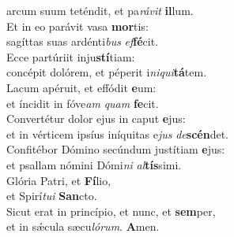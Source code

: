 \oddverse arcum suum teténdit, et pa\textit{rá}\textit{vit} \textbf{il}lum.\\
\evenverse Et in eo parávit vasa \textbf{mor}tis:~\*\\
\evenverse sagíttas suas ardénti\textit{bus} \textit{ef}\textbf{fé}cit.\\
\oddverse Ecce partúriit inju\textbf{stí}tiam:~\*\\
\oddverse concépit dolórem, et péperit i\textit{ni}\textit{qui}\textbf{tá}tem.\\
\evenverse Lacum apéruit, et effódit \textbf{e}um:~\*\\
\evenverse et íncidit in fóve\textit{am} \textit{quam} \textbf{fe}cit.\\
\oddverse Convertétur dolor ejus in caput \textbf{e}jus:~\*\\
\oddverse et in vérticem ipsíus iníquitas e\textit{jus} \textit{de}\textbf{scén}det.\\
\evenverse Confitébor Dómino secúndum justítiam \textbf{e}jus:~\*\\
\evenverse et psallam nómini Dómi\textit{ni} \textit{al}\textbf{tís}simi.\\
\oddverse Glória Patri, et \textbf{Fí}lio,~\*\\
\oddverse et Spirí\textit{tu}\textit{i} \textbf{San}cto.\\
\evenverse Sicut erat in princípio, et nunc, et \textbf{sem}per,~\*\\
\evenverse et in sǽcula sæcu\textit{ló}\textit{rum}. \textbf{A}men.\\
